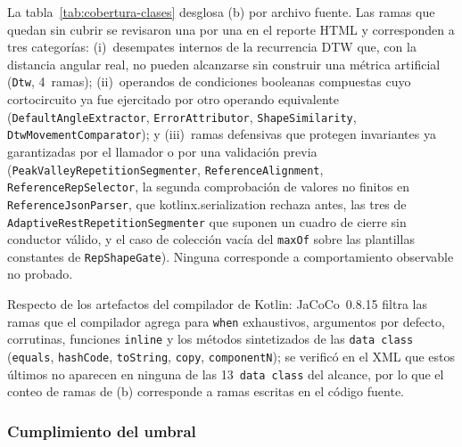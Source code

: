 La tabla~\ref{tab:cobertura-clases} desglosa (b) por archivo fuente. Las ramas que
quedan sin cubrir se revisaron una por una en el reporte HTML y corresponden a tres
categorías: (i)~desempates internos de la recurrencia DTW que, con la distancia angular
real, no pueden alcanzarse sin construir una métrica artificial (\texttt{Dtw}, 4~ramas);
(ii)~operandos de condiciones booleanas compuestas cuyo cortocircuito ya fue ejercitado
por otro operando equivalente (\texttt{DefaultAngleExtractor}, \texttt{ErrorAttributor},
\texttt{ShapeSimilarity}, \texttt{DtwMovementComparator}); y (iii)~ramas defensivas que
protegen invariantes ya garantizadas por el llamador o por una validación previa
(\texttt{PeakValleyRepetitionSegmenter}, \texttt{ReferenceAlignment},
\texttt{ReferenceRepSelector}, la segunda comprobación de valores no finitos en
\texttt{ReferenceJsonParser}, que kotlinx.serialization rechaza antes, las tres de
\texttt{AdaptiveRestRepetitionSegmenter} que suponen un cuadro de cierre sin conductor
válido, y el caso de colección vacía del \texttt{maxOf} sobre las plantillas constantes de
\texttt{RepShapeGate}). Ninguna corresponde a comportamiento observable no probado.

Respecto de los artefactos del compilador de Kotlin: JaCoCo~0.8.15 filtra las ramas que el
compilador agrega para \texttt{when} exhaustivos, argumentos por defecto, corrutinas,
funciones \texttt{inline} y los métodos sintetizados de las \texttt{data class}
(\texttt{equals}, \texttt{hashCode}, \texttt{toString}, \texttt{copy},
\texttt{componentN}); se verificó en el XML que estos últimos no aparecen en ninguna de las
13~\texttt{data class} del alcance, por lo que el conteo de ramas de (b) corresponde a
ramas escritas en el código fuente.

\begin{table}[htbp]
  \centering
  \caption{Cobertura del alcance declarado (b) por archivo fuente. ``Ramas sint.'' cuenta
    ramas no cubiertas en métodos sintetizados por el compilador de Kotlin (0 en todos los
    casos: JaCoCo las filtra).}
  \label{tab:cobertura-clases}
  \scriptsize
\end{table}

\subsubsection{Cumplimiento del umbral}

